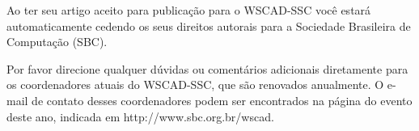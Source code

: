 \documentclass[10pt,twocolumn]{article}
\begin{document}
Ao ter seu artigo aceito para publicação para o WSCAD-SSC você estará automaticamente
cedendo os seus direitos autorais para a Sociedade Brasileira de Computação (SBC). 



Por favor direcione qualquer dúvidas ou comentários adicionais diretamente 
para os coordenadores atuais do WSCAD-SSC, que são renovados anualmente. O e-mail de
contato desses coordenadores podem ser encontrados 
na página do evento deste ano, indicada em http://www.sbc.org.br/wscad. 



\end{document}
